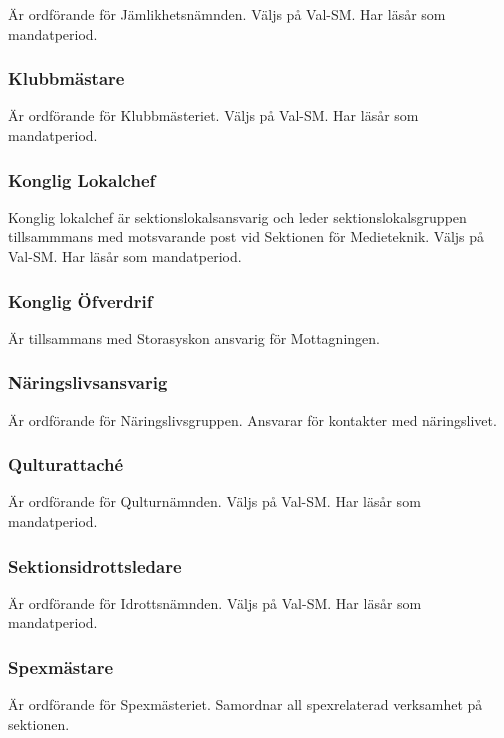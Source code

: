 \documentclass[a4paper,12pt]{article}
\begin{document}
Är ordförande för Jämlikhetsnämnden. Väljs på Val-SM. Har läsår som mandatperiod.

\subsubsection{Klubbmästare}

Är ordförande för Klubbmästeriet. Väljs på Val-SM. Har läsår som mandatperiod.

\subsubsection{Konglig Lokalchef}

Konglig lokalchef är sektionslokalsansvarig och leder sektionslokalsgruppen tillsammmans med motsvarande post vid Sektionen för Medieteknik. Väljs på Val-SM. Har läsår som mandatperiod.

\subsubsection{Konglig Öfverdrif}

Är tillsammans med Storasyskon ansvarig för Mottagningen.

\subsubsection{Näringslivsansvarig}

Är ordförande för Näringslivsgruppen. Ansvarar för kontakter med näringslivet.

\subsubsection{Qulturattaché}

Är ordförande för Qulturnämnden. Väljs på Val-SM. Har läsår som mandatperiod.

\subsubsection{Sektionsidrottsledare}

Är ordförande för Idrottsnämnden. Väljs på Val-SM. Har läsår som mandatperiod.

\subsubsection{Spexmästare}

Är ordförande för Spexmästeriet. Samordnar all spexrelaterad verksamhet på sektionen.
\end{document}
